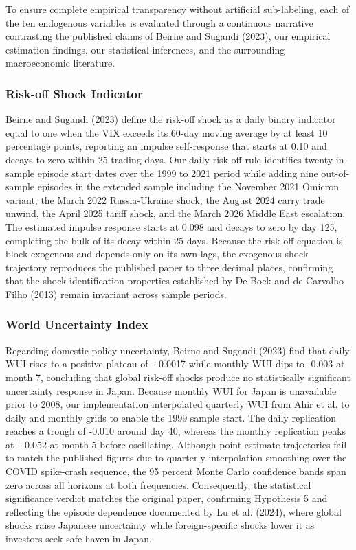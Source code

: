To ensure complete empirical transparency without artificial sub-labeling, each of the ten endogenous variables is evaluated through a continuous narrative contrasting the published claims of Beirne and Sugandi (2023), our empirical estimation findings, our statistical inferences, and the surrounding macroeconomic literature.

\subsubsection{Risk-off Shock Indicator}

Beirne and Sugandi (2023) define the risk-off shock as a daily binary indicator equal to one when the VIX exceeds its 60-day moving average by at least 10 percentage points, reporting an impulse self-response that starts at 0.10 and decays to zero within 25 trading days. Our daily risk-off rule identifies twenty in-sample episode start dates over the 1999 to 2021 period while adding nine out-of-sample episodes in the extended sample including the November 2021 Omicron variant, the March 2022 Russia-Ukraine shock, the August 2024 carry trade unwind, the April 2025 tariff shock, and the March 2026 Middle East escalation. The estimated impulse response starts at 0.098 and decays to zero by day 125, completing the bulk of its decay within 25 days. Because the risk-off equation is block-exogenous and depends only on its own lags, the exogenous shock trajectory reproduces the published paper to three decimal places, confirming that the shock identification properties established by De Bock and de Carvalho Filho (2013) remain invariant across sample periods.

\subsubsection{World Uncertainty Index}

Regarding domestic policy uncertainty, Beirne and Sugandi (2023) find that daily WUI rises to a positive plateau of +0.0017 while monthly WUI dips to -0.003 at month 7, concluding that global risk-off shocks produce no statistically significant uncertainty response in Japan. Because monthly WUI for Japan is unavailable prior to 2008, our implementation interpolated quarterly WUI from Ahir et al. to daily and monthly grids to enable the 1999 sample start. The daily replication reaches a trough of -0.010 around day 40, whereas the monthly replication peaks at +0.052 at month 5 before oscillating. Although point estimate trajectories fail to match the published figures due to quarterly interpolation smoothing over the COVID spike-crash sequence, the 95 percent Monte Carlo confidence bands span zero across all horizons at both frequencies. Consequently, the statistical significance verdict matches the original paper, confirming Hypothesis 5 and reflecting the episode dependence documented by Lu et al. (2024), where global shocks raise Japanese uncertainty while foreign-specific shocks lower it as investors seek safe haven in Japan.

